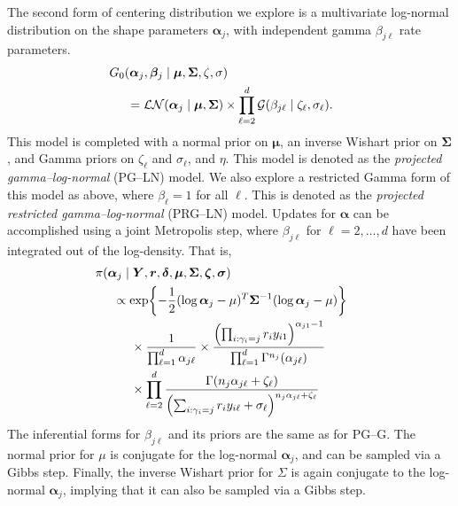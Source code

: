 The second form of centering distribution we explore is a multivariate log-normal distribution on the shape parameters $\bm{\alpha}_j$, with independent gamma $\beta_{j\ell}$ rate parameters.  
    \begin{equation}
        \begin{aligned}
        &\hspace{-0.5cm}G_0\left(\bm{\alpha}_j,\bm{\beta}_j\mid\bm{\mu},\bm{\Sigma},\zeta,\sigma\right) \\
        &=\mathcal{LN}\left(\bm{\alpha}_j\mid\bm{\mu},\bm{\Sigma}\right)\times\prod_{\ell = 2}^d\mathcal{G}\left(\beta_{j\ell}\mid\zeta_{\ell},\sigma_{\ell}\right).
        \end{aligned}
    \end{equation}
    This model is completed with a normal prior on $\bm{\mu}$, an inverse Wishart prior on
    $\bm{\Sigma}$, and Gamma priors on $\zeta_{\ell}$ and $\sigma_{\ell}$, and $\eta$.  
    This model is denoted as the \emph{projected gamma--log-normal} (PG--LN) model.  
    We also explore a restricted Gamma form of this model as above, where 
    $\beta_{\ell} = 1$ for all $\ell$.  This is denoted as the 
    \emph{projected restricted gamma--log-normal} (PRG--LN) model.  Updates for 
    $\bm{\alpha}$ can be accomplished using a joint Metropolis step, where 
    $\beta_{j\ell}$ for $\ell = 2,\ldots,d$ have been integrated out of the 
    log-density.  That is,
    \begin{equation*}
        \begin{aligned}
        &\hspace{-0.5cm}\pi(\bm{\alpha}_j\mid\bm{Y},\bm{r},\bm{\delta},\bm{\mu},\bm{\Sigma},\bm{\zeta},\bm{\sigma})\\
        &\propto \exp\left\lbrace-\frac{1}{2}(\log\bm{\alpha}_j - \mu)^T\bm{\Sigma}^{-1}(\log\bm{\alpha}_j - \mu)\right\rbrace \\
        &\hspace{0.5cm}\times\frac{1}{\prod_{\ell = 1}^d\alpha_{j\ell}}\times \frac{\left(\prod_{i:\gamma_i = j}r_iy_{i1}\right)^{\alpha_{j1} - 1}}{\prod_{\ell = 1}^d\Gamma^{n_j}(\alpha_{j\ell})}\\
        &\hspace{0.5cm}\times \prod_{\ell = 2}^d\frac{\Gamma\left(n_j\alpha_{j\ell} + \zeta_{\ell}\right)}{\left(\sum_{i:\gamma_i = j}r_iy_{i\ell} + \sigma_{\ell}\right)^{n_j\alpha_{j\ell} + \zeta_{\ell}}}
        \end{aligned}
    \end{equation*}
    The inferential forms for $\beta_{j\ell}$ and its priors are the same as for PG--G.  The 
  normal prior for $\mu$ is conjugate for the log-normal $\bm{\alpha}_j$, and can be sampled
  via a Gibbs step.  Finally, the inverse Wishart prior for $\Sigma$ is again conjugate to
  the log-normal $\bm{\alpha}_j$, implying that it can also be sampled via a Gibbs step.

